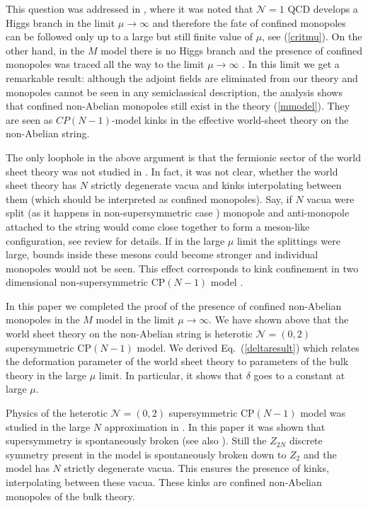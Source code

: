 \documentclass[12pt]{article}
\newcommand{\ntwoo}{${\mathcal N}= \left(0,2\right) $ }
\newcommand{\none}{${\mathcal N}=1$ }
\begin{document}
This question was addressed in \cite{SYhet}, where it was noted that \none QCD  develops a Higgs branch in the 
limit $\mu\to\infty$ 
and therefore the fate of confined monopoles can be followed only up to a
large but still  finite value of $\mu$, see (\ref{critmu}). On the other hand, in the $M$ model
there is no Higgs branch and the presence of confined monopoles was traced all the way to
the limit $\mu\to\infty$ \cite{GSYmmodel}.
In this limit we get a remarkable result: although the adjoint fields 
are eliminated from our theory 
and  monopoles cannot be seen in any semiclassical description,
the  analysis shows
that confined non-Abelian monopoles still exist in the theory (\ref{mmodel}). They are seen
as $CP(N-1)$-model kinks in the effective world-sheet theory on the non-Abelian string.

The only loophole in the above argument is that the fermionic sector of the world sheet theory
was not studied in \cite{GSYmmodel}. In fact, it was not clear, whether the world sheet theory has
$N$ strictly degenerate  vacua and kinks interpolating between them (which should be interpreted as
confined  monopoles). Say, if $N$ vacua were split (as it happens in non-supersymmetric case
\cite{GSY05}) monopole and anti-monopole attached to the string would come close together to form a 
meson-like configuration, see review \cite{SYrev} for details. If in the large $\mu$ limit the splittings
were large, bounds inside these mesons could become stronger and individual monopoles would not
be seen. This effect corresponds to kink confinement in two dimensional 
non-supersymmetric CP$(N-1)$ model \cite{W79}.


In this paper we completed the proof of the presence of confined  non-Abelian monopoles
in the $M$ model in the limit $\mu\to\infty$. We have shown above that the world sheet
theory on the non-Abelian string is heterotic \ntwoo supersymmetric CP$(N-1)$ model.
We derived Eq.~(\ref{deltaresult}) which relates the deformation parameter of the world sheet theory
to parameters of the bulk theory in the large $\mu$ limit. In particular, it shows that $\delta$
goes to a constant  at large $\mu$.

Physics of the heterotic \ntwoo supersymmetric CP$(N-1)$ model was studied in the large $N$ approximation in \cite{SYhet2}. In this paper it was shown that supersymmetry is spontaneously broken (see also \cite{Thetdyn}). Still the $Z_{2N}$ discrete symmetry present in the model is
spontaneously broken down to $Z_2$ and the model has $N$ strictly degenerate vacua.
This ensures the presence of kinks, interpolating between these vacua. These kinks are
confined non-Abelian monopoles of the bulk theory.
\end{document}
